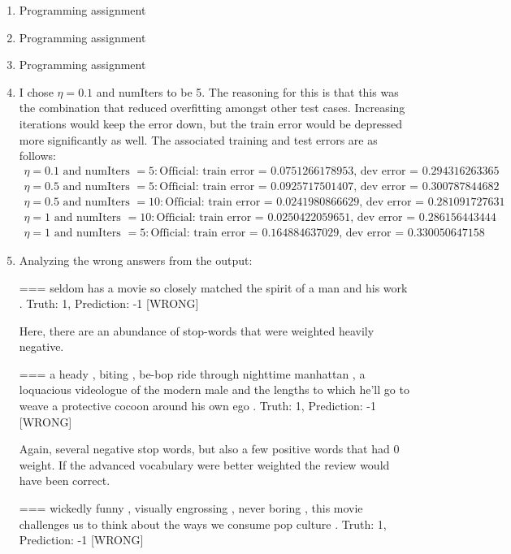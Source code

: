 \documentclass[12pt]{article}
\begin{document}
	\begin{enumerate}[label=(\alph*)]
		\item Programming assignment 
		\item Programming assignment 
		\item Programming assignment 

		\item I chose \(\eta = 0.1\) and numIters to be 5. The reasoning for this
			is that this was the combination that reduced overfitting amongst other
			test cases. Increasing iterations would keep the error down, but the 
			train error would be depressed more significantly as well.
			The associated training and test errors are as follows:
			\begin{gather*}
				\eta = 0.1 \text{ and numIters }= 5:
					\text{Official: train error = 0.0751266178953, dev error = 0.294316263365} \\
				\eta = 0.5 \text{ and numIters }= 5:
					\text{Official: train error = 0.0925717501407, dev error = 0.300787844682} \\
				\eta = 0.5 \text{ and numIters }= 10:
					\text{Official: train error = 0.0241980866629, dev error = 0.281091727631} \\
				\eta = 1 \text{ and numIters }= 10:
					\text{Official: train error = 0.0250422059651, dev error = 0.286156443444} \\
				\eta = 1 \text{ and numIters }= 5:
					\text{Official: train error = 0.164884637029, dev error = 0.330050647158}
			\end{gather*}

		\item Analyzing the wrong answers from the output:

			=== seldom has a movie so closely matched the spirit of a man and his work .
			Truth: 1, Prediction: -1 [WRONG]

				Here, there are an abundance of stop-words that were weighted heavily negative.

			=== a heady , biting , be-bop ride through nighttime manhattan , a loquacious videologue of the modern male and the lengths to which he'll go to weave a protective cocoon around his own ego .
			Truth: 1, Prediction: -1 [WRONG]

				Again, several negative stop words, but also a few positive words that had 0 weight. If the advanced vocabulary were better weighted the review would have been correct.

			=== wickedly funny , visually engrossing , never boring , this movie challenges us to think about the ways we consume pop culture .
			Truth: 1, Prediction: -1 [WRONG]


\end{enumerate}
\end{document}
